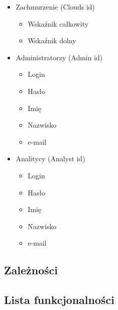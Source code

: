 \documentclass[12pt,a4paper]{article}
\begin{document}
\begin{itemize}
\begin{itemize}
    \end{itemize}
\item Zachmurzenie (Clouds id)
	\begin{itemize}
	\item Wskaźnik całkowity
	\item Wskaźnik dolny
	\end{itemize}
\item Administratorzy (Admin id)
    \begin{itemize}
    \item Login
    \item Hasło
    \item Imię
    \item Nazwisko
    \item e-mail
    \end{itemize}
\item Analitycy (Analyst id)
    \begin{itemize}
    \item Login
    \item Hasło
    \item Imię
    \item Nazwisko
    \item e-mail
    \end{itemize}
\end{itemize}
 
\subsection{Zależności}
 
\subsection{Lista funkcjonalności}
 
\end{document}
